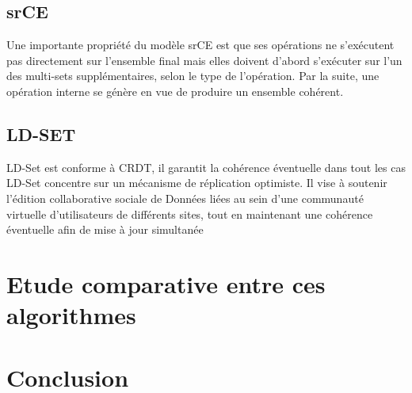 \documentclass[12pt]{report}
\begin{document}
\subsection{srCE}
Une importante propriété du modèle srCE est que ses opérations ne s’exécutent pas 
directement sur l’ensemble final mais elles doivent d’abord s’exécuter sur l’un des multi-sets 
supplémentaires, selon le type de l’opération. Par la suite, une opération interne se génère en vue 
de produire un ensemble cohérent.
\subsection{LD-SET}
LD-Set est conforme à CRDT, il garantit la cohérence éventuelle dans tout les cas LD-Set concentre sur un mécanisme de réplication optimiste. Il vise à
soutenir l’édition collaborative sociale de Données liées au sein d’une communauté virtuelle d’utilisateurs de différents sites, tout en maintenant une cohérence éventuelle afin de mise à jour simultanée
\section{Etude comparative entre ces algorithmes}
\section*{Conclusion}
 

 

\end{document}
